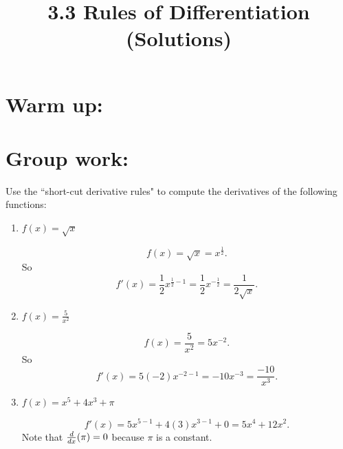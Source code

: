 \documentclass[nooutcomes]{ximera}
\title{3.3 Rules of Differentiation (Solutions)}
\begin{document}
\begin{abstract}		\end{abstract}
\maketitle

\section*{Warm up:} 
	
	\begin{freeResponse}
	\end{freeResponse}	
	
	
	
	
	

\section*{Group work:}

\begin{problem}
Use the ``short-cut derivative rules" to compute the derivatives of the following functions:
	
	\begin{enumerate}
	
	\item $f(x) = \sqrt{x}$
	
		\begin{freeResponse}
		$$f(x) = \sqrt{x} = x^{\frac{1}{2}}.$$ 
		So 
		$$f'(x) = \frac{1}{2} x^{\frac{1}{2} - 1} = \frac{1}{2} x^{-\frac{1}{2}} = \frac{1}{2\sqrt{x}}.$$
		\end{freeResponse}
			
			
	
	\item $f(x) = \frac{5}{x^2}$
	
		\begin{freeResponse}
		$$f(x) = \frac{5}{x^2} = 5x^{-2}.$$  
		So 
		$$f'(x) = 5(-2) x^{-2-1} = -10x^{-3} = \frac{-10}{x^3}.$$  
		\end{freeResponse}
			
			
	
	\item $f(x) = x^5 + 4x^3 + \pi $
	
		\begin{freeResponse}
		$$f'(x) = 5x^{5-1} + 4(3)x^{3-1} + 0 = 5x^4 + 12x^2.$$  
		Note that $\frac{d}{dx} (\pi) = 0$ because $\pi$ is a constant.	
		\end{freeResponse}
			
			
	
	\end{enumerate}
\end{problem}
	
\end{document}

